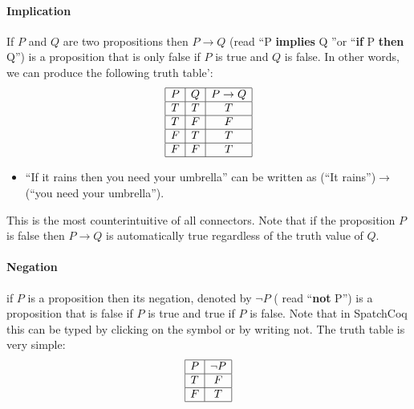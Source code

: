\paragraph{\bf Implication} If $P$ and $Q$ are two propositions then  $P\rightarrow Q$  (read ``P {\bf implies} Q ''or ``{\bf if} P {\bf then} Q'') is a proposition that is only false if  $P$ is true and $Q$ is false. In other words, we can produce the following truth table':
$$\begin{array}{|c|c|c|}\hline P & Q & P\rightarrow Q \\\hline T & T & T \\\hline T & F & F \\\hline F & T & T \\\hline F & F & T\\ \hline\end{array}$$

\begin{itemize}
\item ``If it rains then you need your umbrella'' can be written as (``It rains'')$\rightarrow$(``you need your umbrella'').

\end{itemize}
This is the most counterintuitive of all connectors. Note that if the proposition $P$ is false then $P\rightarrow Q$ is automatically true regardless of the truth value of $Q$.

\paragraph{\bf Negation}
if $P$ is a proposition then its negation, denoted by $\neg P$  ( read ``{\bf not} P'') is a proposition that is  false if  $P$ is true and true if $P$ is false. Note that in SpatchCoq this can be typed by clicking on the symbol or by writing not.
The truth table is very simple:
$$\begin{array}{|c|c|}\hline P & \neg P\\\hline T & F \\\hline F & T\\ \hline\end{array}$$



